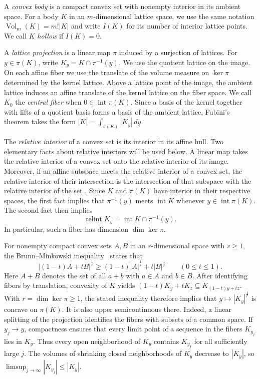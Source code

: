 \documentclass[reqno, 11pt]{article}
\numberwithin{equation}{section}
\theoremstyle{definition}
\DeclareMathOperator{\Vol}{Vol}
\DeclareMathOperator{\intr}{int}
\begin{document}
A \emph{convex body} is a compact convex set with nonempty interior
in its ambient space. For a body $K$ in an $m$-dimensional lattice
space, we use the same notation $\Vol_m(K)=m!|K|$ and write $I(K)$
for its number of interior lattice points. We call $K$ \emph{hollow}
if $I(K)=0$.

A \emph{lattice projection} is a linear map $\pi$ induced by a
surjection of lattices. For $y\in\pi(K)$, write $K_y=K\cap\pi^{-1}(y)$.
We use the quotient lattice on the image. On each affine fiber we
use the translate of the volume measure on $\ker\pi$ determined by
the kernel lattice. Above a lattice point of the image, the ambient
lattice induces an affine translate of the kernel lattice on the
fiber space. We call $K_0$ the \emph{central fiber} when $0\in\intr\pi(K)$.
Since a basis of the kernel together with lifts of a
quotient basis forms a basis of the ambient lattice, Fubini's theorem takes the form
$|K|=\int_{\pi(K)}|K_y|\,dy$.

The \emph{relative interior} of a convex set is its interior in
its affine hull. Two elementary facts about relative interiors will be
used below. A linear map takes the relative interior of a convex set
onto the relative interior of its image. Moreover, if an affine
subspace meets the relative interior of a convex set, the relative
interior of their intersection is the intersection of that subspace
with the relative interior of the set
\cite[Corollary~6.5.1 and Theorem~6.6]{Rockafellar}. Since $K$ and
$\pi(K)$ have interior in their respective spaces, the first fact
implies that $\pi^{-1}(y)$ meets $\intr K$ whenever $y\in\intr\pi(K)$.
The second fact then implies
\begin{equation}\label{eq:relative-fiber}
                 \operatorname{relint} K_y=\intr K\cap\pi^{-1}(y).
\end{equation}
In particular, such a fiber has dimension $\dim\ker\pi$.

For nonempty compact convex sets $A,B$ in an $r$-dimensional
space with $r\ge1$, the Brunn--Minkowski inequality~\cite[Theorem~4.1, inequality~(10)]{Gardner}
states that
\[
  |(1-t)A+tB|^{\frac{1}{r}}
    \ge (1-t)|A|^{\frac{1}{r}}+t|B|^{\frac{1}{r}}
    \qquad (0\le t\le1).
\]
Here $A+B$ denotes the
set of all $a+b$ with $a\in A$ and $b\in B$. After identifying fibers
by translation, convexity of $K$ yields
$(1-t)K_y+tK_z\subseteq K_{(1-t)y+tz}$. With $r=\dim\ker\pi\ge1$,
the stated inequality therefore implies that
$y\mapsto |K_y|^{\frac{1}{r}}$ is concave on $\pi(K)$.
It is also upper semicontinuous there. Indeed, a linear splitting of the projection identifies the fibers
with subsets of a common space.
If $y_j\to y$, compactness ensures that every limit point of a
sequence in the fibers $K_{y_j}$ lies in $K_y$. Thus every open
neighborhood of $K_y$ contains $K_{y_j}$ for all sufficiently large
$j$. The volumes of shrinking closed neighborhoods of $K_y$ decrease
to $|K_y|$, so $\limsup_{j\to\infty}|K_{y_j}|\le |K_y|$.
\end{document}
